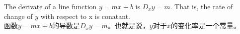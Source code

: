 \documentclass{ctexbook}
\begin{document}
The derivate of a line function $y=mx+b$ is $D_{x}y=m$. That is, the rate of
change of $y$ with respect to x is conatant.
\\
函数$y=mx+b$的导数是$D_{x}y=m$。也就是说，$y$对于$x$的变化率是一个常量。
\end{document}
